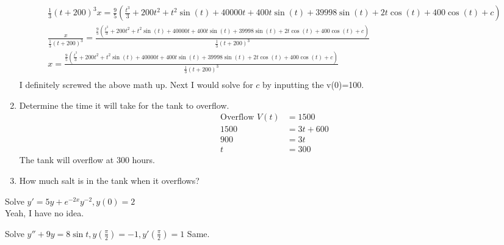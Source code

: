 \begin{prob}
\begin{enumerate}
    \begin{align*}
    \frac{1}{3}(t+200)^3x=\frac{9}{5} \left( \frac{t^3}{3} + 200 t^2 + t^2 \sin(t) + 40000 t + 400 t \sin(t) + 39998 \sin(t) + 2 t \cos(t) + 400 \cos(t) + c \right)\\
    \frac{x}{\frac{1}{3}(t+200)^3}=\frac{\frac{9}{5} \left( \frac{t^3}{3} + 200 t^2 + t^2 \sin(t) + 40000 t + 400 t \sin(t) + 39998 \sin(t) + 2 t \cos(t) + 400 \cos(t) + c \right)}{\frac{1}{3}(t+200)^3}\\
    x=\frac{\frac{9}{5} \left( \frac{t^3}{3} + 200 t^2 + t^2 \sin(t) + 40000 t + 400 t \sin(t) + 39998 \sin(t) + 2 t \cos(t) + 400 \cos(t) + c \right)}{\frac{1}{3}(t+200)^3}\\
    \end{align*}
    I definitely screwed the above math up. Next I would solve for $c$ by inputting the v(0)=100.
    \item Determine the time it will take for the tank to overflow.
    \begin{align*}
        \text{Overflow }V(t)&=1500\\
        1500&=3t+600\\
        900&=3t\\
        t&=300
    \end{align*}
    The tank will overflow at 300 hours.
    \item How much salt is in the tank when it overflows?
\end{enumerate}
\end{prob}
\begin{prob} Solve $y'= 5y +e^{-2x}y^{-2},y(0)=2$\\
Yeah, I have no idea.
\end{prob}
\begin{prob} Solve $y''+9y=8\sin t, y \left( \frac{\pi}{2} \right) =-1, y' \left( \frac{\pi}{2} \right) =1$
Same.
\end{prob}
